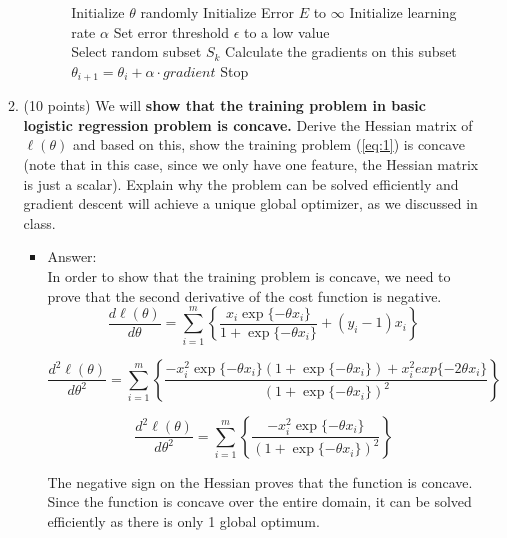 \documentclass[twoside,10pt]{article}
\begin{document}
\begin{enumerate}
\begin{enumerate}
\begin{itemize}
\begin{itemize}
\begin{algorithm}
\begin{algorithmic}
\STATE Initialize $\theta$ randomly
\STATE Initialize Error $E$ to $\infty$
\STATE Initialize learning rate $\alpha$
\STATE Set error threshold $\epsilon$ to a low value\\
\STATE 
{}
\STATE Select random subset $S_k$
\STATE Calculate the gradients on this subset
\STATE $\theta_{i+1} = \theta_{i} + \alpha \cdot gradient$
\STATE Stop
\ENDIF

\ENDWHILE
\end{algorithmic}
\end{algorithm}
\end{itemize}

\end{itemize}

\item (10 points) We will {\bf show that the training problem in basic logistic regression problem is concave.} Derive the Hessian matrix of $\ell(\theta)$ and based on this, show the training problem (\ref{eq:1}) is concave (note that in this case, since we only have one feature, the Hessian matrix is just a scalar). Explain why the problem can be solved efficiently and gradient descent will achieve a unique global optimizer, as we discussed in class. 

\begin{itemize}
\item Answer:\\
In order to show that the training problem is concave, we need to prove that the second derivative of the cost function is negative.
$$\frac{d\ell(\theta)}{d\theta} = \sum_{i=1}^m \left\{\frac{x_i\exp\{-\theta x_i\}}{1+\exp\{-\theta x_i\}} + (y_i-1)x_i\right\} $$

$$\frac{d^2\ell(\theta)}{d\theta^2} = \sum_{i=1}^m \left\{\frac{-x_i^2\exp\{-\theta x_i\}(1+\exp\{-\theta x_i\}) + x_i^2exp\{-2\theta x_i\}}{(1+\exp\{-\theta x_i\})^2} \right\} $$

$$\frac{d^2\ell(\theta)}{d\theta^2} = \sum_{i=1}^m \left\{\frac{-x_i^2\exp\{-\theta x_i\}}{(1+\exp\{-\theta x_i\})^2} \right\} $$

The negative sign on the Hessian proves that the function is concave. Since the function is concave over the entire domain, it can be solved efficiently as there is only 1 global optimum.

\end{itemize}

\end{enumerate}
 

\end{enumerate}
\end{document}
